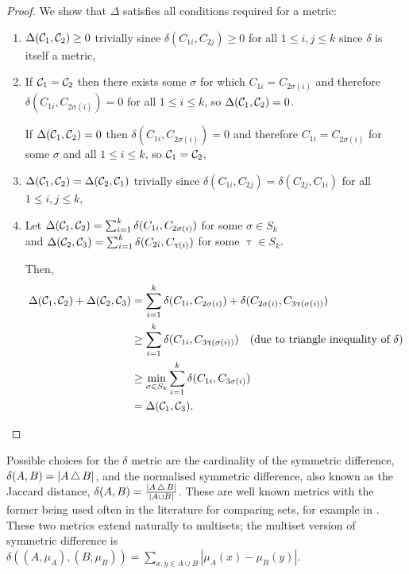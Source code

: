 \begin{proof}
  We show that $\Delta$ satisfies all conditions required for a metric:
  \begin{enumerate}
  \item $\Delta(\mathcal{C}_1, \mathcal{C}_2) \geq 0$ trivially since
    $\delta(C_{1i}, C_{2j}) \geq 0$ for all $1 \leq i,j \leq k$ since
    $\delta$ is itself a metric,
  \item If $\mathcal{C}_1 = \mathcal{C}_2$ then there exists some $\sigma$ for which
    $C_{1i} = C_{2\sigma(i)}$ and therefore $\delta(C_{1i},
    C_{2\sigma(i)}) = 0$ for all $1 \leq i \leq k$, so $\Delta(\mathcal{C}_1,
    \mathcal{C}_2) = 0$.

    If $\Delta(\mathcal{C}_1, \mathcal{C}_2) = 0$ then $\delta(C_{1i},
    C_{2\sigma(i)}) = 0$ and therefore $C_{1i} = C_{2\sigma(i)}$ for
    some $\sigma$ and all $1 \leq i \leq k$, so $\mathcal{C}_1 = \mathcal{C}_2$,
  \item $\Delta(\mathcal{C}_1, \mathcal{C}_2) = \Delta(\mathcal{C}_2, \mathcal{C}_1)$
    trivially since $\delta(C_{1i}, C_{2j}) = \delta(C_{2j}, C_{1i})$
    for all $1 \leq i,j \leq k$,
  \item Let $\Delta(\mathcal{C}_1, \mathcal{C}_2) = \sum_{i=1}^{k} \delta(C_{1i},
    C_{2\sigma(i)})$ for
    some $\sigma \in S_k$\\
    and $\Delta(\mathcal{C}_2, \mathcal{C}_3) = \sum_{i=1}^{k} \delta(C_{2i},
    C_{\uptau(i)})$ for some $\uptau \in S_k$.
    
    Then,
    \vspace{-1.5em}
    \begin{align*}
      \Delta(\mathcal{C}_1, \mathcal{C}_2) + \Delta(\mathcal{C}_2, \mathcal{C}_3) &=
      \sum_{i=1}^{k} \delta(C_{1i},
      C_{2\sigma(i)}) + \delta(C_{2\sigma(i)}, C_{3\uptau(\sigma(i))})\\
      &\geq \sum_{i=1}^{k} \delta(C_{1i},
      C_{3\uptau(\sigma(i))})\quad\text{(due to
        triangle inequality of $\delta$)}\\
      &\geq \min_{\sigma \in S_k} \sum_{i=1}^{k} \delta(C_{1i}, C_{3\sigma(i)})\\
      &= \Delta(\mathcal{C}_1, \mathcal{C}_3).
    \end{align*}
  \end{enumerate}
  \vspace{-3.5em}
\end{proof}

Possible choices for the $\delta$ metric are the cardinality of the symmetric
difference, $\delta(A,B) = |A \operatorname{\bigtriangleup} B|$, and the normalised symmetric
difference, also known as the Jaccard distance, $\delta(A,B) = \frac{|A
  \operatorname{\bigtriangleup} B|}{|A \cup B|}$.  These are well known metrics with the former
being used often in the literature for comparing sets, for example in
\cite{reynolds2006clustering}.  These two metrics extend naturally to
multisets; the multiset version of symmetric difference is
$\delta((A,\mu_A),(B,\mu_B)) = \sum_{x,y \in A \cup B} |\mu_A(x)-\mu_B(y)|$.

